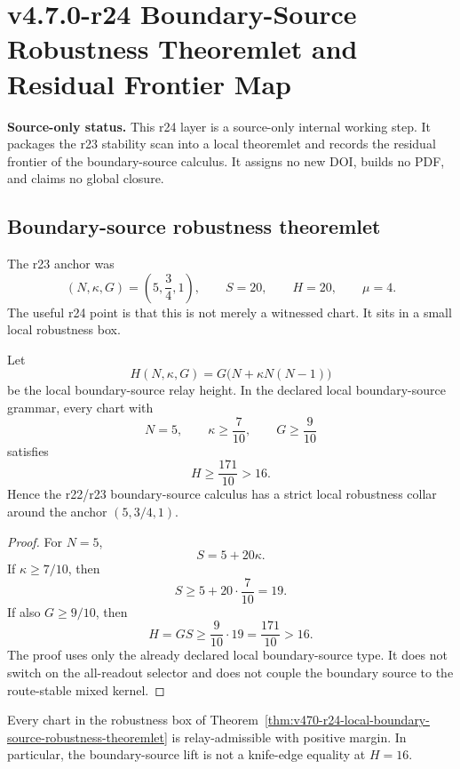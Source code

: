 \section{v4.7.0-r24 Boundary-Source Robustness Theoremlet and Residual Frontier Map}
\label{sec:v470-r24-boundary-source-theoremlet-frontier}

\noindent\textbf{Source-only status.}  This r24 layer is a source-only internal
working step.  It packages the r23 stability scan into a local theoremlet and
records the residual frontier of the boundary-source calculus.  It assigns no
new DOI, builds no PDF, and claims no global closure.

\subsection{Boundary-source robustness theoremlet}
\label{subsec:v470-r24-boundary-source-theoremlet}

The r23 anchor was
\[
(N,\kappa,G)=\left(5,\frac34,1\right),
\qquad
S=20,
\qquad
H=20,
\qquad
\mu=4.
\]
The useful r24 point is that this is not merely a witnessed chart.  It sits in a
small local robustness box.

\begin{theorem}
\label{thm:v470-r24-local-boundary-source-robustness-theoremlet}
Let
\[
H(N,\kappa,G)=G\bigl(N+\kappa N(N-1)\bigr)
\]
be the local boundary-source relay height.  In the declared local
boundary-source grammar, every chart with
\[
N=5,
\qquad
\kappa\geq\frac7{10},
\qquad
G\geq\frac9{10}
\]
satisfies
\[
H\geq \frac{171}{10}>16.
\]
Hence the r22/r23 boundary-source calculus has a strict local robustness collar
around the anchor \((5,3/4,1)\).
\end{theorem}

\begin{proof}
For \(N=5\),
\[
S=5+20\kappa.
\]
If \(\kappa\geq7/10\), then
\[
S\geq5+20\cdot\frac7{10}=19.
\]
If also \(G\geq9/10\), then
\[
H=GS\geq \frac9{10}\cdot19=\frac{171}{10}>16.
\]
The proof uses only the already declared local boundary-source type.  It does
not switch on the all-readout selector and does not couple the boundary source
to the route-stable mixed kernel.
\end{proof}

\begin{corollary}
\label{cor:v470-r24-strict-local-relay-pass}
Every chart in the robustness box of
Theorem~\ref{thm:v470-r24-local-boundary-source-robustness-theoremlet} is
relay-admissible with positive margin.  In particular, the boundary-source
lift is not a knife-edge equality at \(H=16\).
\end{corollary}


